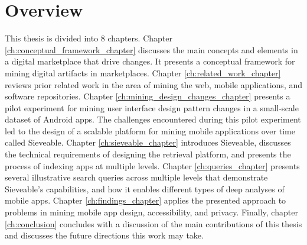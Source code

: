 \section{Overview}
This thesis is divided into 8 chapters.
Chapter \ref{ch:conceptual_framework_chapter} discusses the main concepts and elements in a digital marketplace that drive changes.
It presents a conceptual framework for mining digital artifacts in marketplaces.
Chapter \ref{ch:related_work_chapter} reviews prior related work in the area of mining the web, mobile applications, and software repositories.
Chapter \ref{ch:mining_design_changes_chapter} presents a pilot experiment for mining user interface design pattern changes in a small-scale dataset of Android apps.
The challenges encountered during this pilot experiment led to the design of a scalable platform for mining mobile applications over time called Sieveable.
Chapter \ref{ch:sieveable_chapter} introduces Sieveable, discusses the technical requirements of designing the retrieval platform, and presents the process of indexing apps at multiple levels.
Chapter \ref{ch:queries_chapter} presents several illustrative search queries across multiple levels that demonstrate Sieveable's capabilities, and how it enables different types of deep analyses of mobile apps.
Chapter \ref{ch:findings_chapter} applies the presented approach to problems in mining mobile app design, accessibility, and privacy.
Finally, chapter \ref{ch:conclusion} concludes with a discussion of the main contributions of this thesis and discusses the future directions this work may take.
